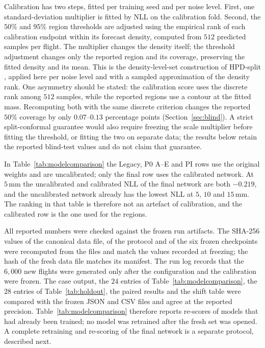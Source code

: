 \documentclass[11pt,a4paper]{article}
\begin{document}
Calibration has two steps, fitted per training seed and per noise level. First, one standard-deviation multiplier is fitted by NLL on the calibration fold. Second, the $50\%$ and $95\%$ region thresholds are adjusted using the empirical rank of each calibration endpoint within its forecast density, computed from $512$ predicted samples per flight. The multiplier changes the density itself; the threshold adjustment changes only the reported region and its coverage, preserving the fitted density and its mean. This is the density-level-set construction of HPD-split \cite{hpdsplit2022}, applied here per noise level and with a sampled approximation of the density rank. One asymmetry should be stated: the calibration score uses the discrete rank among $512$ samples, while the reported regions use a contour at the fitted mass. Recomputing both with the same discrete criterion changes the reported $50\%$ coverage by only $0.07$--$0.13$ percentage points (Section~\ref{sec:blind}). A strict split-conformal guarantee would also require freezing the scale multiplier before fitting the threshold, or fitting the two on separate data; the results below retain the reported blind-test values and do not claim that guarantee.

In Table~\ref{tab:modelcomparison} the Legacy, P0 A--E and PI rows use the original weights and are uncalibrated; only the final row uses the calibrated network. At $5\,\mathrm{mm}$ the uncalibrated and calibrated NLL of the final network are both $-0.219$, and the uncalibrated network already has the lowest NLL at $5$, $10$ and $15\,\mathrm{mm}$. The ranking in that table is therefore not an artefact of calibration, and the calibrated row is the one used for the regions.

All reported numbers were checked against the frozen run artifacts. The SHA-256 values of the canonical data file, of the protocol and of the six frozen checkpoints were recomputed from the files and match the values recorded at freezing; the hash of the fresh data file matches its manifest. The run log records that the $6{,}000$ new flights were generated only after the configuration and the calibration were frozen. The case output, the $24$ entries of Table~\ref{tab:modelcomparison}, the $28$ entries of Table~\ref{tab:holdout}, the paired results and the shift table were compared with the frozen JSON and CSV files and agree at the reported precision. Table~\ref{tab:modelcomparison} therefore reports re-scores of models that had already been trained; no model was retrained after the fresh set was opened. A complete retraining and re-scoring of the final network is a separate protocol, described next.
\end{document}
